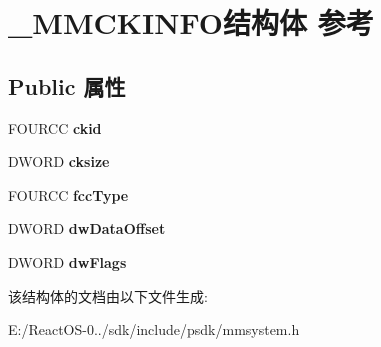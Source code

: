 \hypertarget{struct___m_m_c_k_i_n_f_o}{}\section{\+\_\+\+M\+M\+C\+K\+I\+N\+F\+O结构体 参考}
\label{struct___m_m_c_k_i_n_f_o}
\subsection*{Public 属性}
\begin{DoxyCompactItemize}
\item 
\mbox{\label{struct___m_m_c_k_i_n_f_o_a0761c48fc648c386d3ee4931cdf3b1ba}} 
F\+O\+U\+R\+CC {\bfseries ckid}
\item 
\mbox{\label{struct___m_m_c_k_i_n_f_o_a38e17a821841ada5ab6105a2e0002ea2}} 
D\+W\+O\+RD {\bfseries cksize}
\item 
\mbox{\label{struct___m_m_c_k_i_n_f_o_afc1924b3794357dd4c4b17dea3b3a047}} 
F\+O\+U\+R\+CC {\bfseries fcc\+Type}
\item 
\mbox{\label{struct___m_m_c_k_i_n_f_o_a468a4b05cc3646f7314def2858b8f0b1}} 
D\+W\+O\+RD {\bfseries dw\+Data\+Offset}
\item 
\mbox{\label{struct___m_m_c_k_i_n_f_o_a97fd5742efc037c607af8df0d901e4ea}} 
D\+W\+O\+RD {\bfseries dw\+Flags}
\end{DoxyCompactItemize}


该结构体的文档由以下文件生成\+:\begin{DoxyCompactItemize}
\item 
E\+:/\+React\+O\+S-\/0../sdk/include/psdk/mmsystem.\+h\end{DoxyCompactItemize}
